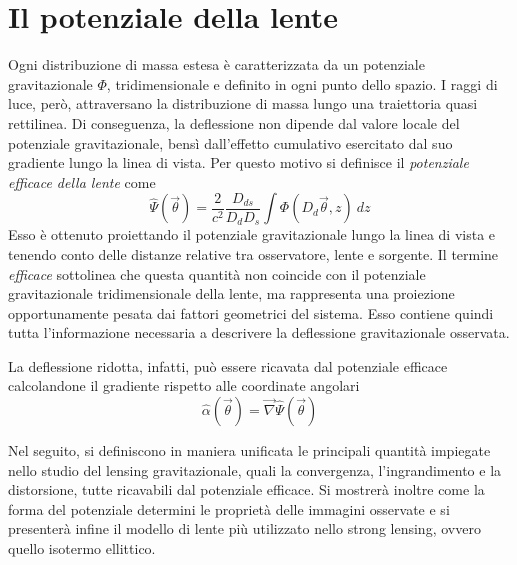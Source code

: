 \section{Il potenziale della lente}
\label{sez:lensing_potential}
Ogni distribuzione di massa estesa è caratterizzata da un potenziale gravitazionale $\Phi$, tridimensionale e definito in ogni punto dello spazio. I raggi di luce, però, attraversano la distribuzione di massa lungo una traiettoria quasi rettilinea. Di conseguenza, la deflessione non dipende dal valore locale del potenziale gravitazionale, bensì dall'effetto cumulativo esercitato dal suo gradiente lungo la linea di vista.
Per questo motivo si definisce il \emph{potenziale efficace della lente} come
\begin{equation}
    \hat \Psi (\vec \theta)=\frac{2}{c^2}\frac{D_{ds}}{D_dD_s}\int \Phi(D_d\vec \theta, z)\ dz
\end{equation}
Esso è ottenuto proiettando il potenziale gravitazionale lungo la linea di vista e tenendo conto delle distanze relative tra osservatore, lente e sorgente. Il termine \emph{efficace} sottolinea che questa quantità non coincide con il potenziale gravitazionale tridimensionale della lente, ma rappresenta una proiezione opportunamente pesata dai fattori geometrici del sistema. Esso contiene quindi tutta l'informazione necessaria a descrivere la deflessione gravitazionale osservata.

La deflessione ridotta, infatti, può essere ricavata dal potenziale efficace calcolandone il gradiente rispetto alle coordinate angolari
\begin{equation}
  \hat{\alpha}(\vec\theta)=\vec\nabla\hat\Psi(\vec\theta) 
\end{equation}

Nel seguito, si definiscono in maniera unificata le principali quantità impiegate nello studio del lensing gravitazionale, quali la convergenza, l'ingrandimento e la distorsione, tutte ricavabili dal potenziale efficace. Si mostrerà inoltre come la forma del potenziale determini le proprietà delle immagini osservate e si presenterà infine il modello di lente più utilizzato nello strong lensing, ovvero quello isotermo ellittico.


